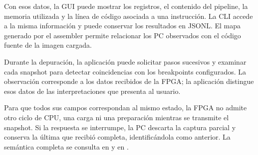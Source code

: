 Con esos datos, la GUI puede mostrar los registros, el contenido del pipeline,
la memoria utilizada y la línea de código asociada a una instrucción. La CLI
accede a la misma información y puede conservar los resultados en JSONL. El
mapa generado por el assembler permite relacionar los PC observados con el
código fuente de la imagen cargada.

Durante la depuración, la aplicación puede solicitar pasos sucesivos y examinar
cada snapshot para detectar coincidencias con los breakpoints configurados. La
observación corresponde a los datos recibidos de la FPGA; la aplicación
distingue esos datos de las interpretaciones que presenta al usuario.

Para que todos sus campos correspondan al mismo estado, la FPGA no admite otro
ciclo de CPU, una carga ni una preparación mientras se transmite el snapshot.
Si la respuesta se interrumpe, la PC descarta la captura parcial y conserva la
última que recibió completa, identificándola como anterior. La semántica
completa se consulta en
 y en
.
